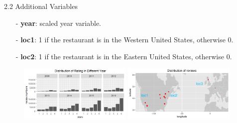 \documentclass[10pt]{beamer}
\begin{document}
\begin{frame}{2.2 Additional Variables}

\begin{itemize}
	\item[-] \textbf{year}: scaled year variable.
	
	\item[-] \textbf{loc1}: 1 if the restaurant is in the Western United States, otherwise 0.
	
	\item[-] \textbf{loc2}: 1 if the restaurant is in the Eastern United States, otherwise 0.
	
\end{itemize}


\begin{figure}[htbp]
\centering
\begin{minipage}[t]{0.5\textwidth}
\centering
\includegraphics[width=5.4cm,height=2.7cm]{../image/year.png}

\end{minipage}
\begin{minipage}[t]{0.48\textwidth}
\centering
\includegraphics[width=5.4cm,height=2.7cm]{../image/worldmap.png}

\end{minipage}
\end{figure}

\end{frame}
\end{document}
